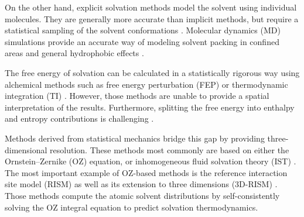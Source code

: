 \documentclass[9pt,tutorial]{livecoms}
\begin{document}
On the other hand, explicit solvation methods model the solvent using individual molecules.
They are generally more accurate than implicit methods, but require a statistical sampling of the solvent conformations \cite{Liu2016-md-solubility,Swails2014-cphmd}.
Molecular dynamics (MD) simulations provide an accurate way of modeling solvent packing in confined areas \cite{Haider2016-water-on-surfaces} and general hydrophobic effects \cite{Pratt2016-hydrophobicity}.

The free energy of solvation can be calculated in a statistically rigorous way using alchemical methods \cite{Liu2016-md-solubility,Mobley2009-dgsolv,Mobley2014-freesolv} such as free energy perturbation (FEP) \cite{Zwanzig1954-reweighting} or thermodynamic integration (TI) \cite{Kirkwood1935-ti}.
However, those methods are unable to provide a spatial interpretation of the results.
Furthermore, splitting the free energy into enthalpy and entropy contributions is challenging \cite{Peter2004-alchemical-entropy}.

Methods derived from statistical mechanics bridge this gap by providing three-dimensional resolution.
These methods most commonly are based on either the Ornstein–Zernike (OZ) equation, or \cite{Hansen2013-simple-liquids} inhomogeneous fluid solvation theory (IST) \cite{Lazaridis1998}.
The most important example of OZ-based methods is the reference interaction site model (RISM) \cite{Chandler1972-rism} as well as its extension to three dimensions (3D-RISM) \cite{Kovalenko1998-3drism}.
Those methods compute the atomic solvent distributions by self-consistently solving the OZ integral equation to predict solvation thermodynamics.
\end{document}
